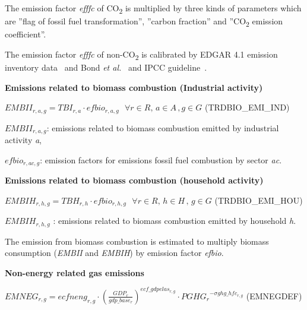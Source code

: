 \documentclass[10pt,a4paper,titlepage,dvipdfmx]{book}
\begin{document}
    The emission factor \textit{efffc} of CO\textsubscript{2} is multiplied by three kinds of parameters which are ''flag of fossil fuel transformation'', ''carbon fraction'' and ''CO\textsubscript{2} emission coefficient''.

The emission factor \textit{efffc} of non-CO\textsubscript{2} is calibrated by EDGAR 4.1 emission inventory data~\cite{RN2148} and Bond \textit{et al.}~\cite{RN4030} and IPCC guideline~\cite{RN2947}.

\begin{flushleft}\textbf{Emissions related to biomass combustion (Industrial activity)}\end{flushleft}


\begin{center}$EMBII_{r,a,g}=TBI_{r,a}\cdot efbio_{r,a,g}\,\,\,\,\forall r\in R,\,a\in A\,,g\in G$ (TRDBIO\_EMI\_IND)
\end{center}

\begin{flushleft}
$EMBII_{r,a,g}$: emissions related to biomass combustion emitted by industrial activity \textit{a},

$efbio_{r,ac,g}$: emission factors for emissions fossil fuel combustion by sector \textit{ac}.
\end{flushleft}

\begin{flushleft}\textbf{Emissions related to biomass combustion (household activity)}\end{flushleft}


\begin{center}$EMBIH_{r,h,g}=TBH_{r,h}\cdot efbio_{r,h,g}\,\,\,\,\forall r\in R,\,h\in H\,,\,g\in G$ (TRDBIO\_EMI\_HOU)
\end{center}

\begin{flushleft} $EMBIH_{r,h,g}$ : emissions related to biomass combustion emitted by household \textit{h}. \end{flushleft}

 The emission from biomass combustion is estimated to multiply biomass consumption (\textit{EMBII} and \textit{EMBIH}) by emission factor \textit{efbio}.

\begin{flushleft}\textbf{Non-energy related gas emissions}\end{flushleft}


\begin{center}$EMNEG_{r,g}=ecfneng_{r,g}\cdot \left(\frac{GDP_{r}}{gdp\_ base_{r}}\right)^{ecf\_ gdpelas_{r,g}}\cdot PGH{G_{r}}^{-\sigma ghg\_ hf{c_{r,g}}}$ (EMNEGDEF)
\end{center}
\end{document}
